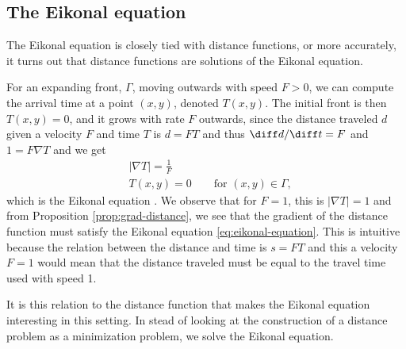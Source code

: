 \subsection{The Eikonal equation}
The Eikonal equation is closely tied with distance functions, or more accurately, it turns out that distance functions are solutions of the Eikonal equation. 

For an expanding front, $\Gamma$, moving outwards with speed $F>0$, we can compute the arrival time at a point $(x, y)$, denoted $T(x, y)$. The initial front is then $T(x, y)=0$, and it grows with rate $F$ outwards, since the distance traveled $d$ given a velocity $F$ and time $T$ is $d=FT$ and thus $\diff d/\diff t=F$ and $1=F \nabla T$ and we get
\begin{equation}
    \begin{aligned}
        &|\nabla T| = \frac{1}{F} \\
        &T(x, y)=0 \qquad \text{for } (x, y) \in \Gamma, 
    \end{aligned}
    \label{eq:eikonal-equation}
\end{equation}
which is the Eikonal equation \cite{sethian1999level}. We observe that for $F=1$, this is $|\nabla T|=1$ and from Proposition \ref{prop:grad-distance}, we see that the gradient of the distance function must satisfy the Eikonal equation \eqref{eq:eikonal-equation}. This is intuitive because the relation between the distance and time is $s=FT$ and this a velocity $F=1$ would mean that the distance traveled must be equal to the travel time used with speed 1.

It is this relation to the distance function that makes the Eikonal equation interesting in this setting. In stead of looking at the construction of a distance problem as a minimization problem, we solve the Eikonal equation. 

\begin{comment}
\begin{enumerate}
    \item Relation to Hamilton Jacobi and Level set formulation
    \item Distance function - stupid approach :-) vs idea behind fast marching - boundary moving with speed 1.
    \item Algorithm for FMM??
\end{enumerate}
\end{comment}


\clearpage